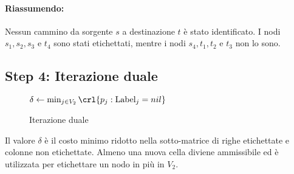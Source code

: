 \documentclass[\main/main.tex]{subfiles}
\begin{document}
\paragraph*{Riassumendo:}
Nessun cammino da sorgente \(s\) a destinazione \(t\) è stato identificato. I nodi \(s_1, s_2, s_3\) e \(t_4\) sono stati etichettati, mentre i nodi \(s_4, t_1, t_2\) e \(t_3\) non lo sono.

\clearpage
\subsection{Step 4: Iterazione duale}
\begin{figure}
	\begin{algorithm}[H]
		\SetAlgoLined
		\(\delta \leftarrow \min_{j \in V_2}\crl{p_j: \text{Label}_j = nil}\)\;
		\caption{Iterazione duale}
	\end{algorithm}
\end{figure}

Il valore \(\delta \) è il costo minimo ridotto nella sotto-matrice di righe etichettate e colonne non etichettate. Almeno una nuova cella diviene ammissibile ed è utilizzata per etichettare un nodo in più in \(V_2\).
\end{document}
